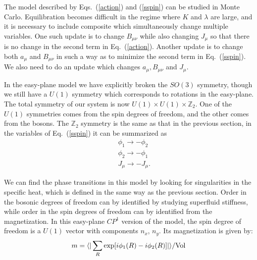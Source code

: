 \documentclass[prb,twocolumn]{revtex4-1}
\def\ztwo{\mathbb{Z}_2}
\begin{document}
The model described by  Eqs.~(\ref{action}) and (\ref{sspin}) can be studied in Monte Carlo. Equilibration becomes difficult in the regime where $K$ and $\lambda$ are large, and it is necessary to include composite which simultaneously change multiple variables. One such update is to change $B_{\mu\nu}$ while also changing $J_\mu$ so that there is no change in the second term in Eq.~(\ref{action}). Another update is to change both $a_\mu$ and $B_{\mu\nu}$ in such a way as to minimize the second term in Eq.~(\ref{sspin}). We also need to do an update which changes $a_\mu, B_{\mu\nu}$ and $J_\mu$. 

In the easy-plane model we have explicitly broken the $SO(3)$ symmetry, though we still have a $U(1)$ symmetry which corresponds to rotations in the easy-plane. The total symmetry of our system is now $U(1)\times U(1)\times\ztwo$. One of the $U(1)$ symmetries comes from the spin degrees of freedom, and the other comes from the bosons. The $\ztwo$ symmetry is the same as that in the previous section, 
 in the variables of Eq.~(\ref{sspin}) it can be summarized as
\begin{eqnarray}
&& \phi_1\rightarrow -\phi_2 \nonumber\\
&& \phi_2\rightarrow -\phi_1 \label{z2}\\
&& J_\mu \rightarrow -J_\mu \nonumber.
\end{eqnarray}

We can find the phase transitions in this model by looking for singularities in the specific heat, which is defined in the same way as the previous section. Order in the bosonic degrees of freedom can by identified by studying superfluid stiffness, while order in the spin degrees of freedom can by identified from the magnetization. In this easy-plane $CP^1$ version of the model, the spin degree of freedom is a $U(1)$ vector with components $n_x$, $n_y$. 
Its magnetization is given by:
\begin{equation}
m=\langle|\sum_R \exp[i\phi_1(R)-i\phi_2(R)]|\rangle /{\rm Vol} 
\end{equation}
\end{document}
